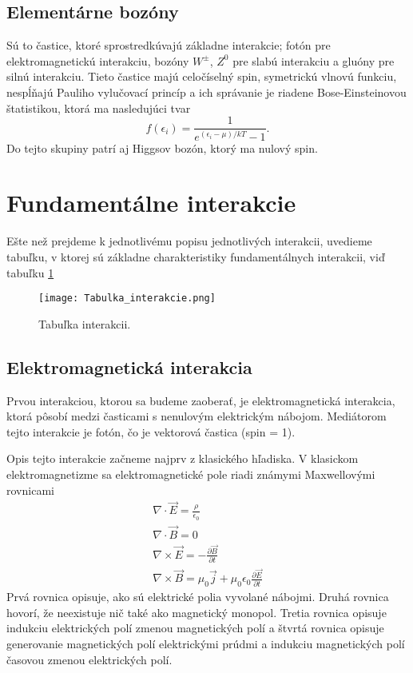 \documentclass[../../main.tex]{subfiles}
\begin{document}
\subsection{Elementárne bozóny}
Sú to častice, ktoré sprostredkúvajú základne interakcie; fotón pre elektromagnetickú interakciu, bozóny $W^{\pm}$, $Z^0$ pre slabú interakciu a gluóny pre silnú interakciu. Tieto častice majú celočíselný spin, symetrickú vlnovú funkciu, nespĺňajú Pauliho vylučovací princíp a ich správanie je riadene Bose-Einsteinovou štatistikou, ktorá ma nasledujúci tvar
\begin{equation}
f(\epsilon_i)=\frac{1}{e^{(\epsilon_i-\mu)/kT}-1}.
\end{equation}
Do tejto skupiny patrí aj Higgsov bozón, ktorý ma nulový spin.

\section{Fundamentálne interakcie}
Ešte než prejdeme k jednotlivému popisu jednotlivých interakcii, uvedieme tabuľku, v ktorej sú základne charakteristiky fundamentálnych interakcii, viď tabuľku \ref{sf1:fig:Tabulka_interakcie}
\begin{figure}[!h]
\texttt{[image: Tabulka\_interakcie.png]}
\caption{Tabuľka interakcii.}
\label{sf1:fig:Tabulka_interakcie}
\end{figure}
\subsection{Elektromagnetická interakcia}
Prvou interakciou, ktorou sa budeme zaoberať, je elektromagnetická interakcia, ktorá pôsobí medzi časticami s nenulovým elektrickým nábojom. Mediátorom tejto interakcie je fotón, čo je vektorová častica (spin = 1).

Opis tejto interakcie začneme najprv z klasického hľadiska. V klasickom elektromagnetizme sa elektromagnetické pole riadi známymi Maxwellovými rovnicami
\begin{equation}
\begin{gathered}
\nabla \cdot \vec{E} = \frac{\rho}{\epsilon_0}\\
\nabla \cdot \vec{B} = 0\\
\nabla \times \vec{E}=-\frac{\partial \vec{B}}{\partial t}\\
\nabla \times \vec{B}= \mu_0 \vec{j}+\mu_0\epsilon_0\frac{\partial \vec{E}}{\partial t}
\end{gathered}
\end{equation} 
Prvá rovnica opisuje, ako sú elektrické polia vyvolané nábojmi. Druhá rovnica hovorí, že neexistuje nič také ako magnetický monopol. Tretia rovnica opisuje indukciu elektrických polí zmenou magnetických polí a štvrtá rovnica opisuje generovanie magnetických polí elektrickými prúdmi a indukciu magnetických polí časovou zmenou elektrických polí.
\end{document}
